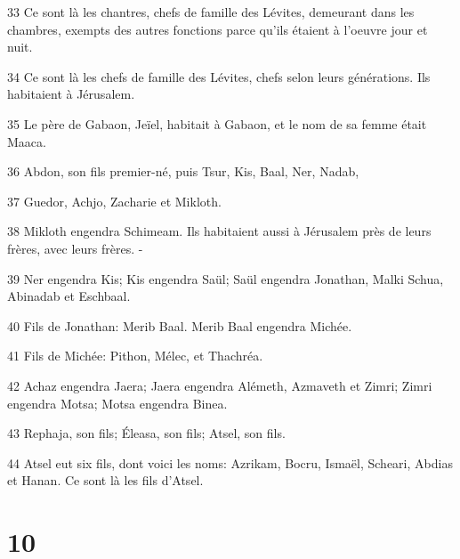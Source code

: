\par 33 Ce sont là les chantres, chefs de famille des Lévites, demeurant dans les chambres, exempts des autres fonctions parce qu'ils étaient à l'oeuvre jour et nuit.
\par 34 Ce sont là les chefs de famille des Lévites, chefs selon leurs générations. Ils habitaient à Jérusalem.
\par 35 Le père de Gabaon, Jeïel, habitait à Gabaon, et le nom de sa femme était Maaca.
\par 36 Abdon, son fils premier-né, puis Tsur, Kis, Baal, Ner, Nadab,
\par 37 Guedor, Achjo, Zacharie et Mikloth.
\par 38 Mikloth engendra Schimeam. Ils habitaient aussi à Jérusalem près de leurs frères, avec leurs frères. -
\par 39 Ner engendra Kis; Kis engendra Saül; Saül engendra Jonathan, Malki Schua, Abinadab et Eschbaal.
\par 40 Fils de Jonathan: Merib Baal. Merib Baal engendra Michée.
\par 41 Fils de Michée: Pithon, Mélec, et Thachréa.
\par 42 Achaz engendra Jaera; Jaera engendra Alémeth, Azmaveth et Zimri; Zimri engendra Motsa; Motsa engendra Binea.
\par 43 Rephaja, son fils; Éleasa, son fils; Atsel, son fils.
\par 44 Atsel eut six fils, dont voici les noms: Azrikam, Bocru, Ismaël, Scheari, Abdias et Hanan. Ce sont là les fils d'Atsel.

\chapter{10}

